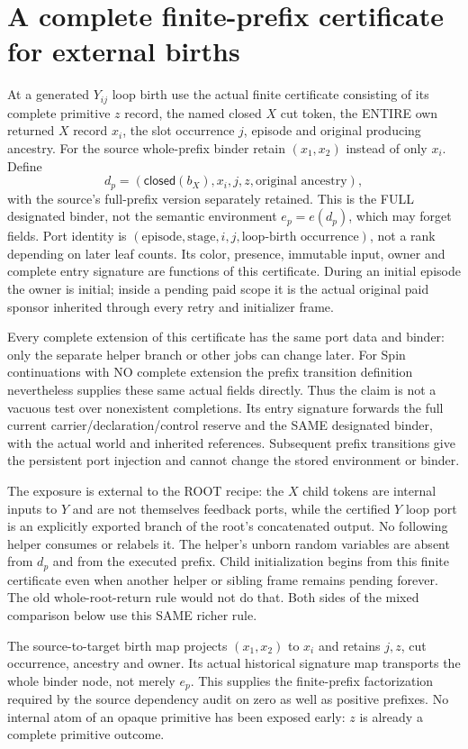 \documentclass{article}
\begin{document}
\section{A complete finite-prefix certificate for external births}
At a generated $Y_{ij}$ loop birth use the actual finite certificate consisting of its complete primitive $z$ record, the named closed $X$ cut token, the ENTIRE own returned $X$ record $x_i$, the slot occurrence $j$, episode and original producing ancestry. For the source whole-prefix binder retain $(x_1,x_2)$ instead of only $x_i$. Define
\[
 d_p=(\mathsf{closed}(b_X),x_i,j,z,\text{original ancestry}),
\]
with the source's full-prefix version separately retained. This is the FULL designated binder, not the semantic environment $e_p=e(d_p)$, which may forget fields. Port identity is $(\text{episode},\text{stage},i,j,\text{loop-birth occurrence})$, not a rank depending on later leaf counts. Its color, presence, immutable input, owner and complete entry signature are functions of this certificate. During an initial episode the owner is initial; inside a pending paid scope it is the actual original paid sponsor inherited through every retry and initializer frame.

Every complete extension of this certificate has the same port data and binder: only the separate helper branch or other jobs can change later. For Spin continuations with NO complete extension the prefix transition definition nevertheless supplies these same actual fields directly. Thus the claim is not a vacuous test over nonexistent completions. Its entry signature forwards the full current carrier/declaration/control reserve and the SAME designated binder, with the actual world and inherited references. Subsequent prefix transitions give the persistent port injection and cannot change the stored environment or binder.

The exposure is external to the ROOT recipe: the $X$ child tokens are internal inputs to $Y$ and are not themselves feedback ports, while the certified $Y$ loop port is an explicitly exported branch of the root's concatenated output. No following helper consumes or relabels it. The helper's unborn random variables are absent from $d_p$ and from the executed prefix. Child initialization begins from this finite certificate even when another helper or sibling frame remains pending forever. The old whole-root-return rule would not do that. Both sides of the mixed comparison below use this SAME richer rule.

The source-to-target birth map projects $(x_1,x_2)$ to $x_i$ and retains $j,z$, cut occurrence, ancestry and owner. Its actual historical signature map transports the whole binder node, not merely $e_p$. This supplies the finite-prefix factorization required by the source dependency audit on zero as well as positive prefixes. No internal atom of an opaque primitive has been exposed early: $z$ is already a complete primitive outcome.
\end{document}
